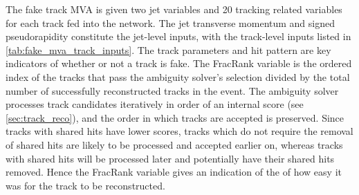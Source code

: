 The fake track MVA is given two jet variables and 20 tracking related variables for each track fed into the network.
The jet transverse momentum and signed pseudorapidity constitute the jet-level inputs, with the track-level inputs listed in \cref{tab:fake_mva_track_inputs}.
The track parameters and hit pattern are key indicators of whether or not a track is fake.
The FracRank variable is the ordered index of the tracks that pass the ambiguity solver's selection divided by the total number of successfully reconstructed tracks in the event.
The ambiguity solver processes track candidates iteratively in order of an internal score (see \cref{sec:track_reco}), and the order in which tracks are accepted is preserved.
Since tracks with shared hits have lower scores, tracks which do not require the removal of shared hits are likely to be processed and accepted earlier on, whereas tracks with shared hits will be processed later and potentially have their shared hits removed.
Hence the FracRank variable gives an indication of the of how easy it was for the track to be reconstructed.

